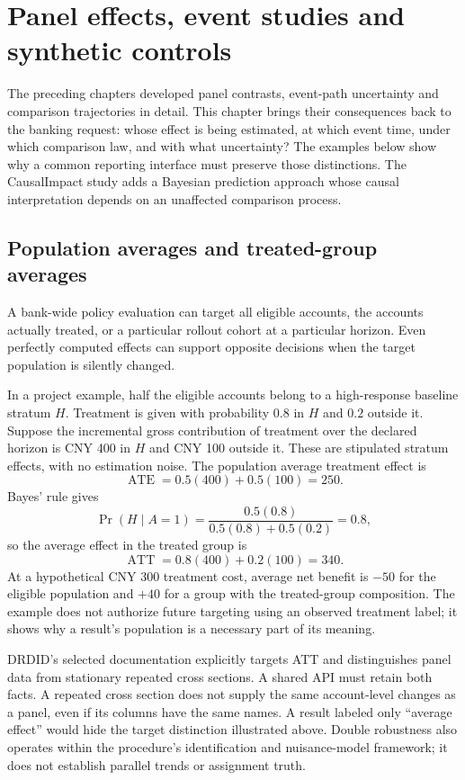\chapter{Panel effects, event studies and synthetic controls}
\label{sw:panels}

The preceding chapters developed panel contrasts, event-path uncertainty and
comparison trajectories in detail. This chapter brings their consequences
back to the banking request: whose effect is being estimated, at which event
time, under which comparison law, and with what uncertainty? The examples
below show why a common reporting interface must preserve those distinctions.
The CausalImpact study adds a Bayesian prediction approach whose causal
interpretation depends on an unaffected comparison process.

\section{Population averages and treated-group averages}

A bank-wide policy evaluation can target all eligible accounts, the accounts
actually treated, or a particular rollout cohort at a particular horizon.
Even perfectly computed effects can support opposite decisions when the target
population is silently changed.

In a project example, half the eligible accounts belong to a high-response
baseline stratum \(H\). Treatment is given with probability \(0.8\) in \(H\)
and \(0.2\) outside it. Suppose the incremental gross contribution of treatment
over the declared horizon is CNY 400 in \(H\) and CNY 100 outside it. These
are stipulated stratum effects, with no estimation noise. The population
average treatment effect is
\[
 \operatorname{ATE}=0.5(400)+0.5(100)=250.
\]
Bayes' rule gives
\[
 \Pr(H\mid A=1)
 =\frac{0.5(0.8)}{0.5(0.8)+0.5(0.2)}=0.8,
\]
so the average effect in the treated group is
\[
 \operatorname{ATT}=0.8(400)+0.2(100)=340.
\]
At a hypothetical CNY 300 treatment cost, average net benefit is \(-50\)
for the eligible population and \(+40\) for a group with the treated-group
composition. The example does not authorize future targeting using an observed
treatment label; it shows why a result's population is a necessary part of its
meaning.

DRDID's selected documentation explicitly targets ATT and distinguishes panel
data from stationary repeated cross sections. A shared API must retain both
facts. A repeated cross section does not supply the same account-level changes
as a panel, even if its columns have the same names. A result labeled only
``average effect'' would hide the target distinction illustrated above.
Double robustness also operates within the procedure's identification and
nuisance-model framework; it does not establish parallel trends or assignment
truth. \citep{v12_sw_drdid}

